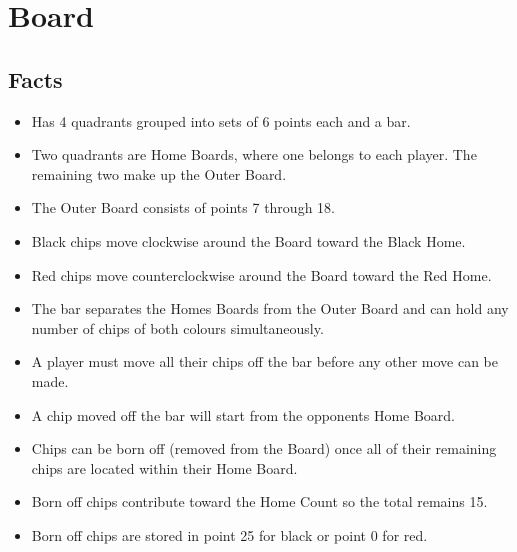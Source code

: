 \section{Board}

\subsection{Facts}

\begin{itemize} [itemsep=2pt,parsep=2pt]
    \item Has 4 quadrants grouped into sets of 6 points each and a bar.
    \item Two quadrants are Home Boards, where one belongs to each player. The remaining two make up         the Outer Board.
    \item The Outer Board consists of points 7 through 18.
    \item Black chips move clockwise around the Board toward the Black Home.
    \item Red chips move counterclockwise around the Board toward the Red Home.
    \item The bar separates the Homes Boards from the Outer Board and can hold any number of chips of        both colours simultaneously.
    \item A player must move all their chips off the bar before any other move can be made.
    \item A chip moved off the bar will start from the opponents Home Board.
    \item Chips can be born off (removed from the Board) once all of their remaining chips are located       within their Home Board.
    \item Born off chips contribute toward the Home Count so the total remains 15.
    \item Born off chips are stored in point 25 for black or point 0 for red.
\end{itemize}


